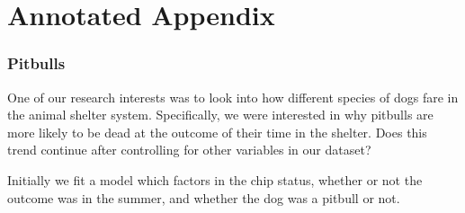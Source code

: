 \documentclass[]{article}
\begin{document}
\section{Annotated Appendix}\label{annotated-appendix}

\subsubsection{Pitbulls}\label{pitbulls}

One of our research interests was to look into how different species of
dogs fare in the animal shelter system. Specifically, we were interested
in why pitbulls are more likely to be dead at the outcome of their time
in the shelter. Does this trend continue after controlling for other
variables in our dataset?

Initially we fit a model which factors in the chip status, whether or
not the outcome was in the summer, and whether the dog was a pitbull or
not.
\end{document}
